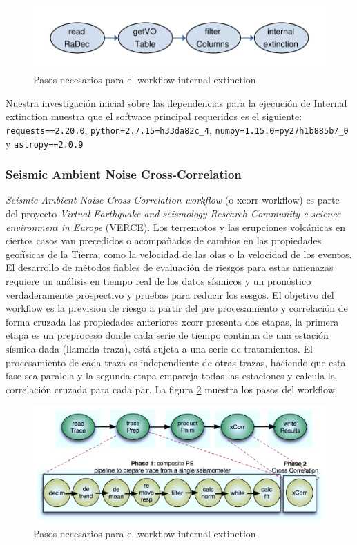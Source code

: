 \begin{figure}[t]
\centering
\includegraphics[width=.8\textwidth]{Figures/internal-extinction}
\caption{Pasos necesarios para el workflow internal extinction}\label{fig:internal}
\end{figure}

Nuestra investigación inicial sobre las dependencias para la ejecución de Internal extinction muestra que el software principal requeridos es el siguiente:  \verb|requests==2.20.0|, \verb|python=2.7.15=h33da82c_4|, \verb|numpy=1.15.0=py27h1b885b7_0| y \verb|astropy==2.0.9|






\subsubsection{Seismic Ambient Noise Cross-Correlation}


\textit{Seismic Ambient Noise Cross-Correlation workflow} (o xcorr workflow) es parte del proyecto \textit{Virtual Earthquake and seismology Research Community e-science environment in Europe} (VERCE).
Los terremotos y las erupciones volcánicas en ciertos casos van precedidos o acompañados de cambios en las propiedades geofísicas de la Tierra, como la velocidad de las olas o la velocidad de los eventos. El desarrollo de métodos fiables de evaluación de riesgos para estas amenazas requiere un análisis en tiempo real de los datos sísmicos y un pronóstico verdaderamente prospectivo y pruebas para reducir los sesgos. El objetivo del workflow es la prevision de riesgo a partir del pre procesamiento y correlación de forma cruzada las propiedades anteriores 
xcorr presenta dos etapas, la primera etapa es un preproceso donde cada serie de tiempo continua de una estación sísmica dada (llamada traza), está sujeta a una serie de tratamientos. El procesamiento de cada traza es independiente de otras trazas, haciendo que esta fase sea paralela y la segunda etapa empareja todas las estaciones y calcula la correlación cruzada para cada par. La figura \ref{fig:xcorr} muestra los pasos del workflow.



\begin{figure}[t]
\centering
\includegraphics[width=.8\textwidth]{Figures/xcorr}
\caption{Pasos necesarios para el workflow internal extinction}\label{fig:xcorr}
\end{figure}


